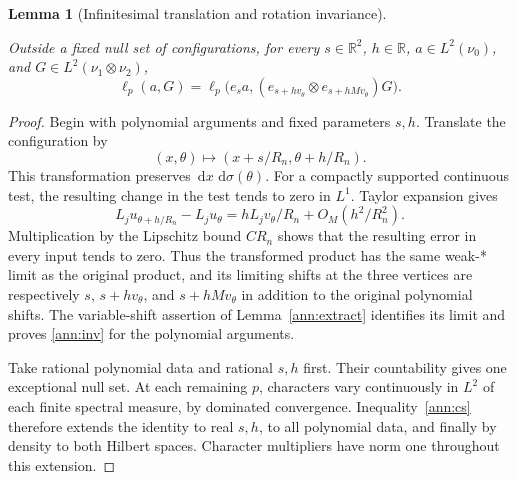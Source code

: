 \documentclass[11pt]{amsart}
\newcommand{\R}{\mathbb R}
\newcommand{\dd}{\,\mathrm d}
\newtheorem{lemma}[theorem]{Lemma}
\theoremstyle{definition}
\theoremstyle{remark}
\numberwithin{equation}{section}
\providecommand{\lean}[1]{}
\providecommand{\leanok}{}
\begin{document}
\begin{lemma}[Infinitesimal translation and rotation invariance]
\label{ann:invariance}
\lean{Auto.ann_invariance}
\leanok
Outside a fixed null set of configurations, for every
$s\in\R^2$, $h\in\R$, $a\in L^2(\nu_0)$, and
$G\in L^2(\nu_1\otimes\nu_2)$,
\begin{equation}\label{ann:inv}
 \ell_p(a,G)=
 \ell_p\bigl(e_sa,
 (e_{s+h v_\theta}\otimes e_{s+hMv_\theta})G\bigr).
\end{equation}
\end{lemma}
\begin{proof}
Begin with polynomial arguments and fixed parameters $s,h$.
Translate the configuration by
\[
 (x,\theta)\longmapsto(x+s/R_n,\theta+h/R_n).
\]
This transformation preserves $\dd x\,\dd\sigma(\theta)$.
For a compactly supported continuous test, the resulting change
in the test tends to zero in $L^1$. Taylor expansion gives
\[
 L_ju_{\theta+h/R_n}-L_ju_\theta
 =hL_jv_\theta/R_n+O_M(h^2/R_n^2).
\]
Multiplication by the Lipschitz bound $CR_n$ shows that the
resulting error in every input tends to zero. Thus the transformed
product has the same weak-* limit as the original product, and
its limiting shifts at the three vertices are respectively
$s$, $s+hv_\theta$, and $s+hMv_\theta$ in addition to the original
polynomial shifts. The variable-shift assertion of
Lemma~\ref{ann:extract} identifies its limit and proves
\eqref{ann:inv} for the polynomial arguments.

Take rational polynomial data and rational $s,h$ first. Their
countability gives one exceptional null set. At each remaining
$p$, characters vary continuously in $L^2$ of each finite spectral
measure, by dominated convergence. Inequality~\eqref{ann:cs}
therefore extends the identity to real $s,h$, to all polynomial
data, and finally by density to both Hilbert spaces. Character
multipliers have norm one throughout this extension.
\end{proof}
\end{document}
